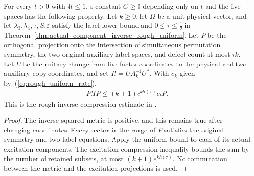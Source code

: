 \begin{theorem}
  \label{thm:actual_low_defect_inverse_rough_compression}
  For every $t>0$ with $4t\leq1$, a constant $C\geq0$ depending only
  on $t$ and the five spaces has the following property.
  Let $k\geq0$, let $\Omega$ be a unit physical vector, and let
  $\lambda_3,\lambda_4,\tau,S,\varepsilon$ satisfy the label lower bound
  and $0\leq\tau\leq\tfrac12$ in Theorem~\ref{thm:actual_component_inverse_rough_uniform}.
  Let $P$ be the orthogonal projection onto the intersection of
  simultaneous permutation symmetry, the two original auxiliary
  label spaces, and defect count at most $\tau k$.
  Let $U$ be the unitary change from five-factor coordinates to the
  physical-and-two-auxiliary copy coordinates, and set $H=UA_k^{-1}U^*$. With $c_k$ given by~(\ref{eq:rough_uniform_rate}),
  \begin{align}
    PHP\leq (k+1)e^{kh(\tau)}c_kP.
  \end{align}
  This is the rough inverse compression estimate in
  \cite[Section~8]{OpenAI2026AreaLaw}.
\end{theorem}
\begin{proof}
  The inverse squared metric is positive, and this remains true
  after changing coordinates. Every vector in the range of $P$
  satisfies the original symmetry and two label equations.
  Apply the uniform bound to each of its actual excitation components.
  The excitation compression inequality bounds the sum by the number
  of retained subsets, at most $(k+1)e^{kh(\tau)}$.
  No commutation between the metric and the excitation projections
  is used.
\end{proof}
